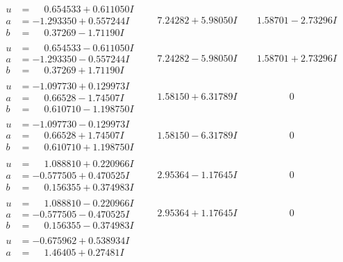 \documentclass[1p]{elsarticle_modified}
\theoremstyle{definition}
\begin{document}
$$\begin{array}{c|c|c}
\begin{aligned}
u &= \phantom{-}0.654533 + 0.611050 I \\
a &= -1.293350 + 0.557244 I \\
b &= \phantom{-}0.37269 - 1.71190 I\end{aligned}
 & \phantom{-}7.24282 + 5.98050 I & \phantom{-}1.58701 - 2.73296 I \\ \hline\begin{aligned}
u &= \phantom{-}0.654533 - 0.611050 I \\
a &= -1.293350 - 0.557244 I \\
b &= \phantom{-}0.37269 + 1.71190 I\end{aligned}
 & \phantom{-}7.24282 - 5.98050 I & \phantom{-}1.58701 + 2.73296 I \\ \hline\begin{aligned}
u &= -1.097730 + 0.129973 I \\
a &= \phantom{-}0.66528 - 1.74507 I \\
b &= \phantom{-}0.610710 - 1.198750 I\end{aligned}
 & \phantom{-}1.58150 + 6.31789 I & \phantom{-0.000000 } 0 \\ \hline\begin{aligned}
u &= -1.097730 - 0.129973 I \\
a &= \phantom{-}0.66528 + 1.74507 I \\
b &= \phantom{-}0.610710 + 1.198750 I\end{aligned}
 & \phantom{-}1.58150 - 6.31789 I & \phantom{-0.000000 } 0 \\ \hline\begin{aligned}
u &= \phantom{-}1.088810 + 0.220966 I \\
a &= -0.577505 + 0.470525 I \\
b &= \phantom{-}0.156355 + 0.374983 I\end{aligned}
 & \phantom{-}2.95364 - 1.17645 I & \phantom{-0.000000 } 0 \\ \hline\begin{aligned}
u &= \phantom{-}1.088810 - 0.220966 I \\
a &= -0.577505 - 0.470525 I \\
b &= \phantom{-}0.156355 - 0.374983 I\end{aligned}
 & \phantom{-}2.95364 + 1.17645 I & \phantom{-0.000000 } 0 \\ \hline\begin{aligned}
u &= -0.675962 + 0.538934 I \\
a &= \phantom{-}1.46405 + 0.27481 I \\

\end{aligned}
\end{array}$$
\end{document}
